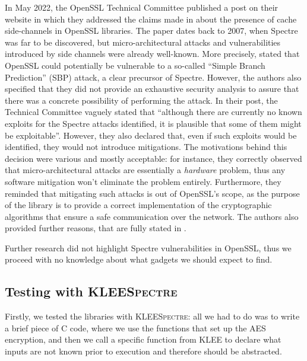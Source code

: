 \documentclass[12pt,a4paper]{book}
\theoremstyle{definition}
\begin{document}
	In May 2022, the OpenSSL Technical Committee published a post on their website \cite{OpenSSL_spectre} in which they addressed the claims made in \cite{Gueron2007} about the presence of cache side-channels in OpenSSL libraries. The paper dates back to 2007, when Spectre was far to be discovered, but micro-architectural attacks and vulnerabilities introduced by side channels were already well-known. More precisely, \cite{Gueron2007} stated that OpenSSL could potentially be vulnerable to a so-called ``Simple Branch Prediction'' (SBP) attack, a clear precursor of Spectre. However, the authors also specified that they did not provide an exhaustive security analysis to assure that there was a concrete possibility of performing the attack. In their post, the Technical Committee vaguely stated that ``although there are currently no known exploits for the Spectre attacks identified, it is plausible that some of them might be exploitable''. However, they also declared that, even if such exploits would be identified, they would not introduce mitigations. The motivations behind this decision were various and mostly acceptable: for instance, they correctly observed that micro-architectural attacks are essentially a \textit{hardware} problem, thus any software mitigation won't eliminate the problem entirely. Furthermore, they reminded that mitigating such attacks is out of OpenSSL's scope, as the purpose of the library is to provide a correct implementation of the cryptographic algorithms that ensure a safe communication over the network. The authors also provided further reasons, that are fully stated in \cite{OpenSSL_spectre}.
	
	Further research did not highlight Spectre vulnerabilities in OpenSSL, thus we proceed with no knowledge about what gadgets we should expect to find.
	
	\subsection{Testing with \textsc{KLEESpectre}}
	Firstly, we tested the libraries with \textsc{\textsc{\textsc{KLEESpectre}}}: all we had to do was to write a brief piece of C code, where we use the functions that set up the AES encryption, and then we call a specific function from \textsc{KLEE} to declare what inputs are not known prior to execution and therefore should be abstracted.
	
\end{document}
